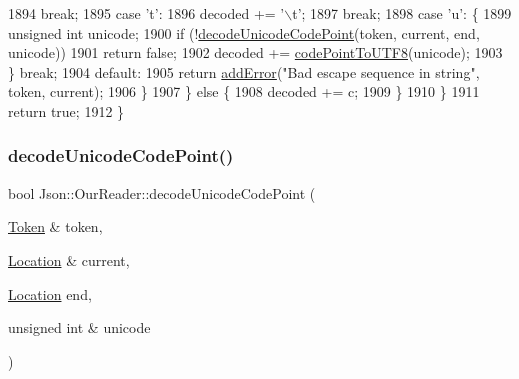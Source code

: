 \begin{DoxyCode}
1894         \textcolor{keywordflow}{break};
1895       \textcolor{keywordflow}{case} \textcolor{charliteral}{'t'}:
1896         decoded += \textcolor{charliteral}{'\(\backslash\)t'};
1897         \textcolor{keywordflow}{break};
1898       \textcolor{keywordflow}{case} \textcolor{charliteral}{'u'}: \{
1899         \textcolor{keywordtype}{unsigned} \textcolor{keywordtype}{int} unicode;
1900         \textcolor{keywordflow}{if} (!\hyperlink{class_json_1_1_our_reader_ac1bf03c161ece082e48da450c50f528d}{decodeUnicodeCodePoint}(token, current, end, unicode))
1901           \textcolor{keywordflow}{return} \textcolor{keyword}{false};
1902         decoded += \hyperlink{namespace_json_a33f8bda65a5b1fc4f5ddc39cb03dc742}{codePointToUTF8}(unicode);
1903       \} \textcolor{keywordflow}{break};
1904       \textcolor{keywordflow}{default}:
1905         \textcolor{keywordflow}{return} \hyperlink{class_json_1_1_our_reader_aa6a920311e6408ff3a45324d49da18a6}{addError}(\textcolor{stringliteral}{"Bad escape sequence in string"}, token, current);
1906       \}
1907     \} \textcolor{keywordflow}{else} \{
1908       decoded += c;
1909     \}
1910   \}
1911   \textcolor{keywordflow}{return} \textcolor{keyword}{true};
1912 \}
\end{DoxyCode}
\mbox{\label{class_json_1_1_our_reader_ac1bf03c161ece082e48da450c50f528d}} 
\subsubsection{\texorpdfstring{decode\+Unicode\+Code\+Point()}{decodeUnicodeCodePoint()}}
{\footnotesize\ttfamily bool Json\+::\+Our\+Reader\+::decode\+Unicode\+Code\+Point (\begin{DoxyParamCaption}\item[{\hyperlink{class_json_1_1_our_reader_1_1_token}{Token} \&}]{token,  }\item[{\hyperlink{class_json_1_1_our_reader_a1bdc7bbc52ba87cae6b19746f2ee0189}{Location} \&}]{current,  }\item[{\hyperlink{class_json_1_1_our_reader_a1bdc7bbc52ba87cae6b19746f2ee0189}{Location}}]{end,  }\item[{unsigned int \&}]{unicode }\end{DoxyParamCaption})\hspace{0.3cm}{\ttfamily [private]}}



